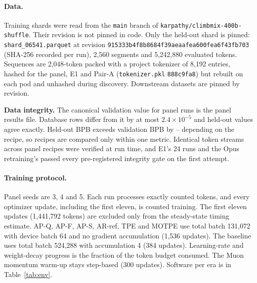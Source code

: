 \documentclass{article}
\newif\ifshowhumanmarkers \showhumanmarkersfalse
\newcommand{\humantag}[1]{{\color{humanframe}\sffamily\scriptsize\bfseries HUMAN AUTHOR MUST REWRITE/VERIFY [#1]}\ }
\newcommand{\humanauthor}[2][]{\ifshowhumanmarkers\begin{humanbox}\humantag{#1}#2\end{humanbox}\else #2\par\fi}
\begin{document}
\paragraph{Data.} Training shards were read from the \texttt{main} branch of \texttt{karpathy/climbmix-400b-shuffle}. Their revision is not pinned in code. Only the held-out shard is pinned: \texttt{shard\_06541.parquet} at revision \texttt{915333b4f8b8684f39aeaafea600fea6f43fb703} (SHA-256 recorded per run), 2,560 segments and 5,242,880 evaluated tokens. Sequences are 2,048-token packed with a project tokenizer of 8,192 entries, hashed for the panel, E1 and Pair-A (\texttt{tokenizer.pkl} \texttt{888c9fa8}) but rebuilt on each pod and unhashed during discovery. Downstream datasets are pinned by revision.

\humanauthor[P2-11]{\textbf{Data integrity.} The canonical validation value for panel runs is the panel results file. Database rows differ from it by at most $2.4\times10^{-5}$ and held-out values agree exactly. Held-out BPB exceeds validation BPB by \CRHeldValOffLo--\CRHeldValOffHi{} depending on the recipe, so recipes are compared only within one metric. Identical token streams across panel recipes were verified at run time, and E1's 24 runs and the Opus retraining's \CRMTRuns{} passed every pre-registered integrity gate on the first attempt.}

\paragraph{Training protocol.} Panel seeds are 3, 4 and 5. Each run processes exactly \CRPanelBudget{} counted tokens, and every optimizer update, including the first eleven, is counted training. The first eleven updates (1,441,792 tokens) are excluded only from the steady-state timing estimate. AP-Q, AP-F, AP-S, AR-ref, TPE and MOTPE use total batch 131,072 with device batch 64 and no gradient accumulation (1,536 updates). The baseline uses total batch 524,288 with accumulation 4 (384 updates). Learning-rate and weight-decay progress is the fraction of the token budget consumed. The Muon \citep{jordan2024muon} momentum warm-up stays step-based (300 updates). Software per era is in Table~\ref{tab:env}.
\end{document}
